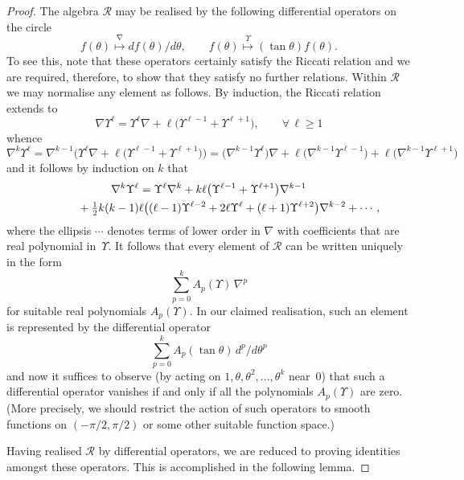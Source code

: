 \documentclass[pdftex]{sigma}
\begin{document}
\begin{proof} The algebra ${\mathcal{R}}$ may be realised by the
following dif\/ferential operators on the circle
\[f(\theta)\stackrel{\nabla}{\longmapsto} df(\theta)/d\theta,\qquad
f(\theta)\stackrel{\Upsilon}{\longmapsto}(\tan\theta)f(\theta).\]
To see this, note that these operators certainly satisfy the Riccati
relation and we are required, therefore, to show that they satisfy no further
relations. Within ${\mathcal{R}}$ we may normalise any element as follows. By
induction, the Riccati relation extends to
\[\nabla\Upsilon^\ell=
\Upsilon^\ell\nabla+\ell\big(\Upsilon^{\ell-1}+\Upsilon^{\ell+1}\big),\qquad
\forall\,\ell\geq 1\]
whence
\[\nabla^k\Upsilon^\ell
=\nabla^{k-1}\big(\Upsilon^\ell\nabla
+\ell\big(\Upsilon^{\ell-1}+\Upsilon^{\ell+1}\big)\big)
=\big(\nabla^{k-1}\Upsilon^\ell\big)\nabla
+\ell\big(\nabla^{k-1}\Upsilon^{\ell-1}\big)+\ell\big(\nabla^{k-1}\Upsilon^{\ell+1}\big)\]
and it follows by induction on $k$ that
\begin{gather*}
\nabla^k\Upsilon^\ell=
\Upsilon^\ell\nabla^k+k\ell\big(\Upsilon^{\ell-1}+\Upsilon^{\ell+1}\big)\nabla^{k-1}\\
\hphantom{\nabla^k\Upsilon^\ell=}{}
+\tfrac12k(k-1)\ell\big((\ell-1)\Upsilon^{\ell-2}+2\ell\Upsilon^\ell
+(\ell+1)\Upsilon^{\ell+2}\big)\nabla^{k-2}+\cdots,
\end{gather*}
where the ellipsis $\cdots$ denotes terms of lower order in $\nabla$ with
coef\/f\/icients that are real polynomial in~$\Upsilon$. It follows that every
element of ${\mathcal{R}}$ can be written uniquely in the form
\[ \sum_{p=0}^{k}A_p(\Upsilon)\,\nabla^p\]
for suitable real polynomials $A_p(\Upsilon)$. In our claimed realisation,
such an element is represented by the dif\/ferential operator
\[ \sum_{p=0}^{k}A_p(\tan\theta)\,d^p/d\theta^p\]
and now it suf\/f\/ices to observe (by acting on
$1,\theta,\theta^2,\ldots,\theta^{k}$ near~$0$) that such a dif\/ferential
operator vanishes if and only if all the polynomials $A_p(\Upsilon)$ are zero.
(More precisely, we should restrict the action of such operators to smooth
functions on $(-\pi/2,\pi/2)$ or some other suitable function space.)

Having realised ${\mathcal{R}}$ by dif\/ferential operators, we are reduced to
proving identities amongst these operators. This is accomplished in the
following lemma.\end{proof}
\end{document}
